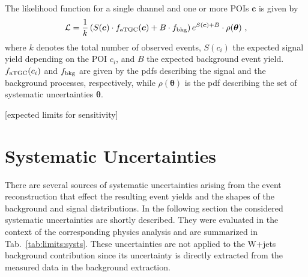 \noindent The likelihood function for a single channel and one or more POIs $\boldsymbol{c}$ is given by
\begin{equation}
\mathcal{L} = \frac{1}{k} \left( S(\boldsymbol{c})\cdot f_{\rm aTGC}(\boldsymbol{c}) + B \cdot f_{\rm bkg} \right) e^{S(\boldsymbol{c}) + B} \cdot \rho(\boldsymbol{\theta})~,
\end{equation}
where $k$ denotes the total number of observed events, $S(c_i)$ the expected signal yield depending on the POI $c_i$, and $B$ the expected background event yield. $f_{\rm aTGC}(c_i)$ and $f_{\rm bkg}$ are given by the pdfs describing the signal and the background processes, respectively, while  $\rho(\boldsymbol{\theta})$ is the pdf describing the set of systematic uncertainties $\boldsymbol{\theta}$.


[expected limits for sensitivity]

\section{Systematic Uncertainties}
\label{sec:systematics}
There are several sources of systematic uncertainties arising from the event reconstruction that effect the resulting event yields and the shapes of the background and signal distributions.  In the following section the considered systematic uncertainties are shortly described. They were evaluated in the context of the corresponding physics analysis \cite{PAS} and are summarized in Tab.~\ref{tab:limits:systs}. These uncertainties are not applied to the W+jets background contribution since its uncertainty is directly extracted from the measured data in the background extraction.
